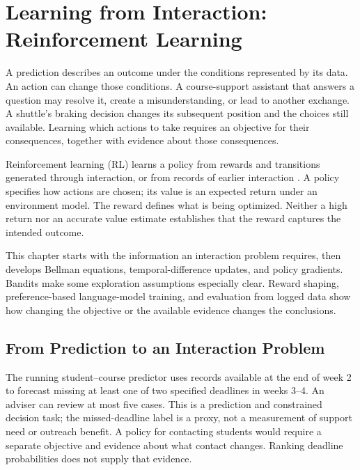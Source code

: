 \begingroup
\raggedbottom
{}
\chapter[Learning from Interaction: Reinforcement Learning]{Learning from Interaction:\\Reinforcement Learning}
\label{ch:reinforcementlearning}

A prediction describes an outcome under the conditions represented by its data. An action can change those conditions. A course-support assistant that answers a question may resolve it, create a misunderstanding, or lead to another exchange. A shuttle's braking decision changes its subsequent position and the choices still available. Learning which actions to take requires an objective for their consequences, together with evidence about those consequences.

Reinforcement learning (RL) learns a policy from rewards and transitions generated through interaction, or from records of earlier interaction \citep{sutton1998}. A policy specifies how actions are chosen; its value is an expected return under an environment model. The reward defines what is being optimized. Neither a high return nor an accurate value estimate establishes that the reward captures the intended outcome.

This chapter starts with the information an interaction problem requires, then develops Bellman equations, temporal-difference updates, and policy gradients. Bandits make some exploration assumptions especially clear. Reward shaping, preference-based language-model training, and evaluation from logged data show how changing the objective or the available evidence changes the conclusions.

\section{From Prediction to an Interaction Problem}

The running student--course predictor uses records available at the end of week 2 to forecast missing at least one of two specified deadlines in weeks 3--4. An adviser can review at most five cases. This is a prediction and constrained decision task; the missed-deadline label is a proxy, not a measurement of support need or outreach benefit. A policy for contacting students would require a separate objective and evidence about what contact changes. Ranking deadline probabilities does not supply that evidence.

